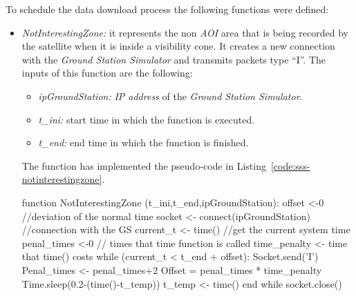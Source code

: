 To schedule the data download process the following functions were defined:
\begin{itemize}
\item \emph{NotInterestingZone:}  it represents the non \emph{AOI} area that is
  being recorded by the satellite when it is inside a visibility cone. It
  creates a new connection with the \emph{Ground Station Simulator} and
  transmits packets type ``I''. The inputs of this function are the following:
\begin{itemize}
\item \emph{ipGroundStation:} \emph{IP address} of the \emph{Ground Station Simulator}.
\item \emph{t\_ini:} start time in which the function is executed.
\item \emph{t\_end:} end time in which the function is finished.
\end{itemize}

The function has implemented the pseudo-code in Listing~\ref{code:sss-notinterestingzone}.

\begin{listing}[
  float=h!,
  caption  = {Pseudocode of \emph{NotInterestingZone} function},
  label    = code:sss-notinterestingzone,
style=customc]
function NotInterestingZone (t_ini,t_end,ipGroundStation):
offset <-0 //deviation of the normal time
socket <- connect(ipGroundStation) //connection with the GS
current_t <- time() //get the current system time
penal_times <-0 // times that time function is called
time_penalty <- time that time() costs
while (current_t  <  t_end + offset):
	Socket.send('I')
	Penal_times <- penal_times+2
	Offset = penal_times * time_penalty
	Time.sleep(0.2-(time()-t_temp))
	t_temp <- time()
end while
socket.close()
\end{listing}


\end{itemize}

